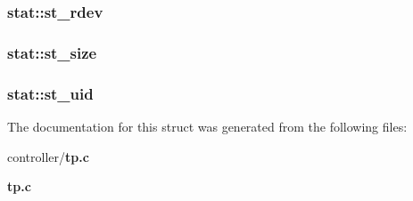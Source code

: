 \subsubsection[{st\_\-rdev}]{ {\bf stat::st\_\-rdev}}\label{structstat_a19878d2506fccbada6f99ff8351e54fc}
\subsubsection[{st\_\-size}]{ {\bf stat::st\_\-size}}\label{structstat_af391341b7f8561e8cbd08602700990a5}
\subsubsection[{st\_\-uid}]{ {\bf stat::st\_\-uid}}\label{structstat_a46d053fe9dd5e601d6c2e3f097819336}


The documentation for this struct was generated from the following files:\begin{DoxyCompactItemize}
\item 
controller/{\bf tp.c}\item 
{\bf tp.c}\end{DoxyCompactItemize}
